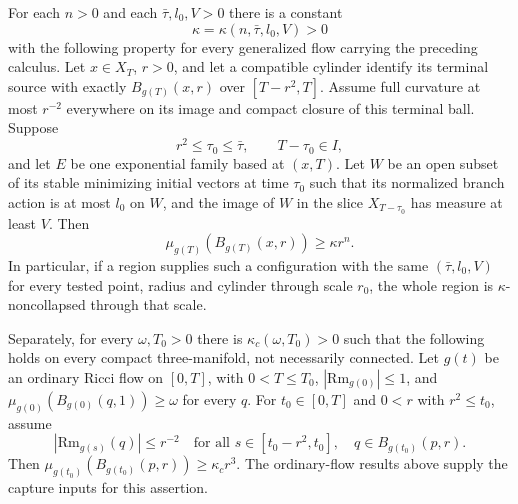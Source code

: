\begin{theorem}
\label{thm:m15-noncollapse}
For each $n>0$ and each $\bar\tau,l_0,V>0$ there is a constant
\[
 \kappa=\kappa(n,\bar\tau,l_0,V)>0
\]
with the following property for every generalized flow carrying the preceding
calculus.  Let $x\in X_T$, $r>0$, and let a compatible cylinder identify
its terminal source with exactly $B_{g(T)}(x,r)$ over $[T-r^2,T]$.
Assume full curvature at most $r^{-2}$ everywhere on its image and compact
closure of this terminal ball.  Suppose
\[
 r^2\leq\tau_0\leq\bar\tau,\qquad T-\tau_0\in I,
\]
and let $E$ be one exponential family based at $(x,T)$.  Let $W$ be an open
subset of its stable minimizing initial vectors at time $\tau_0$ such that
its normalized branch action is at most $l_0$ on $W$, and the image of $W$
in the slice $X_{T-\tau_0}$ has measure at least $V$.  Then
\[
 \mu_{g(T)}(B_{g(T)}(x,r))\geq\kappa r^n.
\]
In particular, if a region supplies such a configuration with the same
$(\bar\tau,l_0,V)$ for every tested point, radius and cylinder through
scale $r_0$, the whole region is $\kappa$-noncollapsed through that scale.

Separately, for every $\omega,T_0>0$ there is $\kappa_c(\omega,T_0)>0$
such that the following holds on every compact three-manifold, not necessarily
connected.  Let $g(t)$ be an ordinary Ricci flow on $[0,T]$, with
$0<T\leq T_0$, $|\mathrm{Rm}_{g(0)}|\leq1$, and
$\mu_{g(0)}(B_{g(0)}(q,1))\geq\omega$ for every $q$.
For $t_0\in[0,T]$ and $0<r$ with $r^2\leq t_0$, assume
\[
 |\mathrm{Rm}_{g(s)}(q)|\leq r^{-2}
 \quad\text{for all }s\in[t_0-r^2,t_0],\quad
                         q\in B_{g(t_0)}(p,r).
\]
Then $\mu_{g(t_0)}(B_{g(t_0)}(p,r))\geq\kappa_c r^3$.
The ordinary-flow results above supply the capture inputs for this assertion.
\cite[Theorem 8.1, Proposition 8.2, Lemma 8.3, Corollary 8.4, Claims 8.5--8.8, Lemma 8.9, and Theorem 8.10]{MT2007}
\end{theorem}
